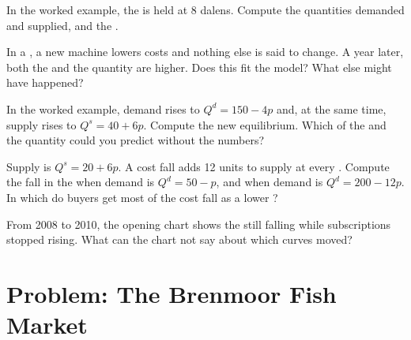 \begin{exercise}[$\star\star$]\label{exo:g9:demand-and-supply-equations:8}
In the worked example, the  is held at 8 dalens. Compute the quantities demanded and supplied,
and the .
\end{exercise}

\begin{exercise}[$\star\star$]\label{exo:g9:demand-and-supply-equations:9}
In a , a new machine lowers costs and nothing else is said to change. A year later, both the
 and the quantity are higher. Does this fit the model? What else might have happened?
\end{exercise}

\begin{exercise}[$\star\star\star$]\label{exo:g9:demand-and-supply-equations:10}
In the worked example, demand rises to $Q^d = 150 - 4p$ and, at the same time, supply rises to $Q^s =
40 + 6p$. Compute the new equilibrium. Which of the  and the quantity could you predict without
the numbers?
\end{exercise}

\begin{exercise}[$\star\star\star$]\label{exo:g9:demand-and-supply-equations:11}
Supply is $Q^s = 20 + 6p$. A cost fall adds 12 units to supply at every . Compute the fall in the
 when demand is $Q^d = 50 - p$, and when demand is $Q^d = 200 - 12p$. In which  do buyers get
most of the cost fall as a lower ?
\end{exercise}

\begin{exercise}[$\star\star\star$]\label{exo:g9:demand-and-supply-equations:12}
From 2008 to 2010, the opening chart shows the  still falling while subscriptions stopped rising.
What can the chart not say about which curves moved?
\end{exercise}

\section{Problem: The Brenmoor Fish Market}

